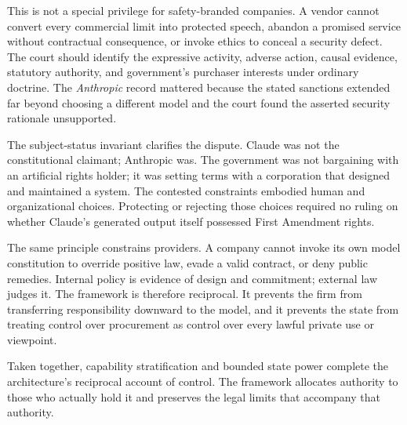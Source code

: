 This is not a special privilege for safety-branded companies. A vendor cannot convert every commercial limit into protected speech, abandon a promised service without contractual consequence, or invoke ethics to conceal a security defect. The court should identify the expressive activity, adverse action, causal evidence, statutory authority, and government's purchaser interests under ordinary doctrine. The \emph{Anthropic} record mattered because the stated sanctions extended far beyond choosing a different model and the court found the asserted security rationale unsupported.

The subject-status invariant clarifies the dispute. Claude was not the constitutional claimant; Anthropic was. The government was not bargaining with an artificial rights holder; it was setting terms with a corporation that designed and maintained a system. The contested constraints embodied human and organizational choices. Protecting or rejecting those choices required no ruling on whether Claude's generated output itself possessed First Amendment rights.

The same principle constrains providers. A company cannot invoke its own model constitution to override positive law, evade a valid contract, or deny public remedies. Internal policy is evidence of design and commitment; external law judges it. The framework is therefore reciprocal. It prevents the firm from transferring responsibility downward to the model, and it prevents the state from treating control over procurement as control over every lawful private use or viewpoint.

Taken together, capability stratification and bounded state power complete the architecture's reciprocal account of control. The framework allocates authority to those who actually hold it and preserves the legal limits that accompany that authority.
